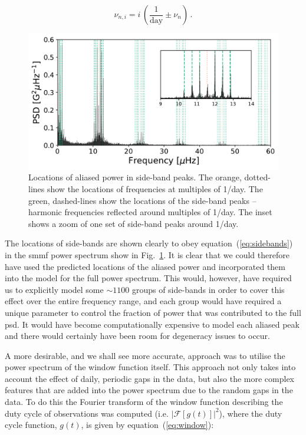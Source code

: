 \begin{equation}
\nu_{n, i} = i \, (\frac{1}{\mathrm{day}} \pm \nu_{n}) \, .
\label{eq:sidebands}
\end{equation}

\begin{figure}[ht!]
	\centering
	\includegraphics[width=\columnwidth]{sideband.pdf}
	\caption{Locations of aliased power in side-band peaks. The orange, dotted-lines show the locations of frequencies at multiples of 1/day. The green, dashed-lines show the locations of the side-band peaks -- harmonic frequencies reflected around multiples of 1/day.  The inset shows a zoom of one set of side-band peaks around 1/day.}
	\label{fig:sideband_locations}
\end{figure}


The locations of side-bands are shown clearly to obey equation~(\ref{eq:sidebands}) in the \gls{smmf} power spectrum show in Fig.~\ref{fig:sideband_locations}. It is clear that we could therefore have used the predicted locations of the aliased power and incorporated them into the model for the full power spectrum. This would, however, have required us to explicitly model some $\sim 1100$ groups of side-bands in order to cover this effect over the entire frequency range, and each group would have required a unique parameter to control the fraction of power that was contributed to the full \gls{psd}. It would have become computationally expensive to model each aliased peak and there would certainly have been room for degeneracy issues to occur.

A more desirable, and we shall see more accurate, approach was to utilise the power spectrum of the window function itself. This approach not only takes into account the effect of daily, periodic gaps in the data, but also the more complex features that are added into the power spectrum due to the random gaps in the data. To do this the Fourier transform of the window function describing the duty cycle of observations was computed (i.e. $\left|\mathcal{F}\left[g(t)\right]\right|^2$), where the duty cycle function, $g(t)$, is given by equation~(\ref{eq:window}):

